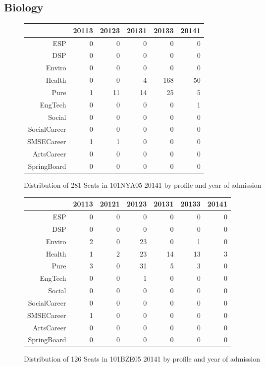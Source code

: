 \documentclass{article}\usepackage[]{graphicx}\usepackage[]{color}
\begin{document}
\subsection{Biology}
\begin{figure}[H]
\centering
\begin{tabular}{rrrrrr}
  \hline
 & 20113 & 20123 & 20131 & 20133 & 20141 \\ 
  \hline
ESP &   0 &   0 &   0 &   0 &   0 \\ 
  DSP &   0 &   0 &   0 &   0 &   0 \\ 
  Enviro &   0 &   0 &   0 &   0 &   0 \\ 
  Health &   0 &   0 &   4 & 168 &  50 \\ 
  Pure &   1 &  11 &  14 &  25 &   5 \\ 
  EngTech &   0 &   0 &   0 &   0 &   1 \\ 
  Social &   0 &   0 &   0 &   0 &   0 \\ 
  SocialCareer &   0 &   0 &   0 &   0 &   0 \\ 
  SMSECareer &   1 &   1 &   0 &   0 &   0 \\ 
  ArtsCareer &   0 &   0 &   0 &   0 &   0 \\ 
  SpringBoard &   0 &   0 &   0 &   0 &   0 \\ 
   \hline
\end{tabular}
\caption{Distribution of 281 Seats in 101NYA05 20141 by profile and year of admission} 
\end{figure}
\begin{figure}[H]
\centering
\begin{tabular}{rrrrrrr}
  \hline
 & 20113 & 20121 & 20123 & 20131 & 20133 & 20141 \\ 
  \hline
ESP &   0 &   0 &   0 &   0 &   0 &   0 \\ 
  DSP &   0 &   0 &   0 &   0 &   0 &   0 \\ 
  Enviro &   2 &   0 &  23 &   0 &   1 &   0 \\ 
  Health &   1 &   2 &  23 &  14 &  13 &   3 \\ 
  Pure &   3 &   0 &  31 &   5 &   3 &   0 \\ 
  EngTech &   0 &   0 &   1 &   0 &   0 &   0 \\ 
  Social &   0 &   0 &   0 &   0 &   0 &   0 \\ 
  SocialCareer &   0 &   0 &   0 &   0 &   0 &   0 \\ 
  SMSECareer &   1 &   0 &   0 &   0 &   0 &   0 \\ 
  ArtsCareer &   0 &   0 &   0 &   0 &   0 &   0 \\ 
  SpringBoard &   0 &   0 &   0 &   0 &   0 &   0 \\ 
   \hline
\end{tabular}
\caption{Distribution of 126 Seats in 101BZE05 20141 by profile and year of admission} 
\end{figure}
\end{document}
